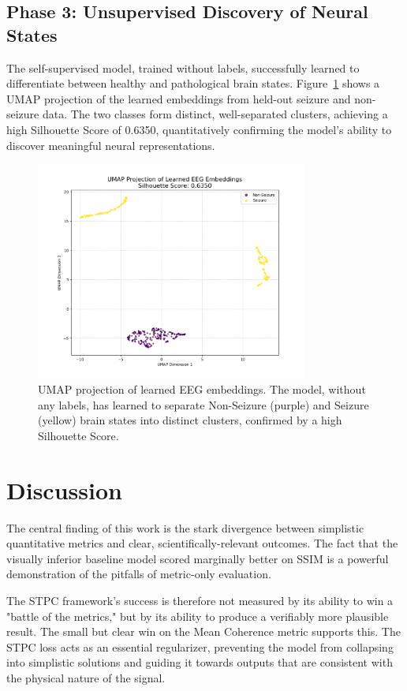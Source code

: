 \documentclass[11pt, a4paper]{article}
\begin{document}
\subsection{Phase 3: Unsupervised Discovery of Neural States}
The self-supervised model, trained without labels, successfully learned to differentiate between healthy and pathological brain states. Figure~\ref{fig:phase3} shows a UMAP projection of the learned embeddings from held-out seizure and non-seizure data. The two classes form distinct, well-separated clusters, achieving a high Silhouette Score of 0.6350, quantitatively confirming the model's ability to discover meaningful neural representations.

\begin{figure}[H]
    \centering
    \includegraphics[width=0.8\textwidth]{figures/phase3_embedding_comparison.png}
    \caption{UMAP projection of learned EEG embeddings. The model, without any labels, has learned to separate Non-Seizure (purple) and Seizure (yellow) brain states into distinct clusters, confirmed by a high Silhouette Score.}
    \label{fig:phase3}
\end{figure}

\section{Discussion}
The central finding of this work is the stark divergence between simplistic quantitative metrics and clear, scientifically-relevant outcomes. The fact that the visually inferior baseline model scored marginally better on SSIM is a powerful demonstration of the pitfalls of metric-only evaluation.

The STPC framework's success is therefore not measured by its ability to win a "battle of the metrics," but by its ability to produce a verifiably more plausible result. The small but clear win on the Mean Coherence metric supports this. The STPC loss acts as an essential regularizer, preventing the model from collapsing into simplistic solutions and guiding it towards outputs that are consistent with the physical nature of the signal.
\end{document}
